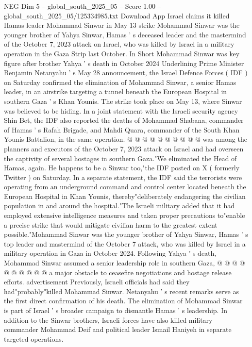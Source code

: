 \begin{textsample}{NEG Dim 5 – global\_south\_2025\_05 – Score 1.00 – global\_south\_2025\_05/125334985.txt}  \label{ex:f5_neg_268}
Download App Israel claims it killed Hamas leader Mohammad Sinwar in May 13 strike Mohammad Sinwar was the younger brother of Yahya Sinwar, Hamas ' s deceased leader and the mastermind of the October 7, 2023 attack on Israel, who was killed by Israel in a military operation in the Gaza Strip last October.
In Short Mohammad Sinwar was key figure after brother Yahya ' s death in October 2024 Underlining Prime Minister Benjamin Netanyahu ' s May 28 announcement, the Israel Defence Forces ( IDF ) on Saturday confirmed the elimination of Mohammad Sinwar, a senior Hamas leader, in an airstrike targeting a tunnel beneath the European Hospital in southern Gaza ' s Khan Younis.
The strike took place on May 13, where Sinwar was believed to be hiding.
In a joint statement with the Israeli security agency Shin Bet, the IDF also reported the deaths of Mohammad Shabana, commander of Hamas ' s Rafah Brigade, and Mahdi Quara, commander of the South Khan Younis Battalion, in the same operation. @ @ @ @ @ @ @ @ @ @ was among the planners and executors of the October 7, 2023 attack on Israel and had overseen the captivity of several hostages in southern Gaza."We eliminated the Head of Hamas, again.
He happens to be a Sinwar too,"the IDF posted on X ( formerly Twitter ) on Saturday.
In a separate statement, the IDF said the terrorists were operating from an underground command and control center located beneath the European Hospital in Khan Younis, thereby"deliberately endangering the civilian population in and around the hospital."The Israeli military added that it had employed extensive intelligence measures and taken proper precautions to"enable a precise strike that would mitigate civilian harm to the greatest extent possible."Mohammad Sinwar was the younger brother of Yahya Sinwar, Hamas ' s top leader and mastermind of the October 7 attack, who was killed by Israel in a military operation in Gaza in October 2024.
Following Yahya ' s death, Mohammad Sinwar assumed a senior leadership role in southern Gaza, @ @ @ @ @ @ @ @ @ @ a major obstacle to ceasefire negotiations and hostage release efforts. advertisement Previously, Israeli officials had said they had"probably"killed Mohammad Sinwar.
Netanyahu ' s recent remarks serve as the first direct confirmation of his death.
The elimination of Mohammad Sinwar is part of Israel ' s broader campaign to dismantle Hamas ' s leadership.
In addition to the Sinwar brothers, Israeli forces have also killed military commander Mohammad Deif and political leader Ismail Haniyeh in separate targeted operations.

\end{textsample}
